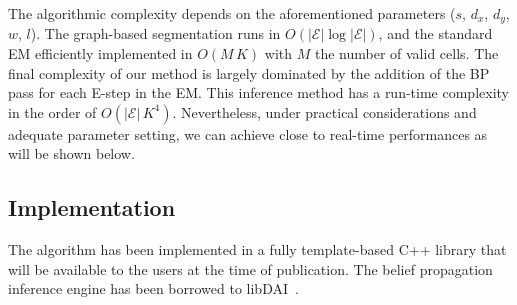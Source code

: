 The algorithmic complexity depends on the aforementioned parameters ($s$, $d_x$,
$d_y$, $w$, $l$). The graph-based segmentation runs in
$O(|\mathcal{E}|\log|\mathcal{E}|)$, and the standard EM efficiently implemented
in $O(M\,K)$ with $M$ the number of valid cells. The final complexity of our
method is largely dominated by the addition of the BP pass for each E-step in
the EM. This inference method has a run-time complexity in the order of
$O(|\mathcal{E}|\,K^4)$. Nevertheless, under practical considerations and
adequate parameter setting, we can achieve close to real-time performances as
will be shown below.

\subsection{Implementation}

The algorithm has been implemented in a fully template-based C++ library that
will be available to the users at the time of publication. The belief
propagation inference engine has been borrowed to libDAI~\cite{mooij10libdai}.
